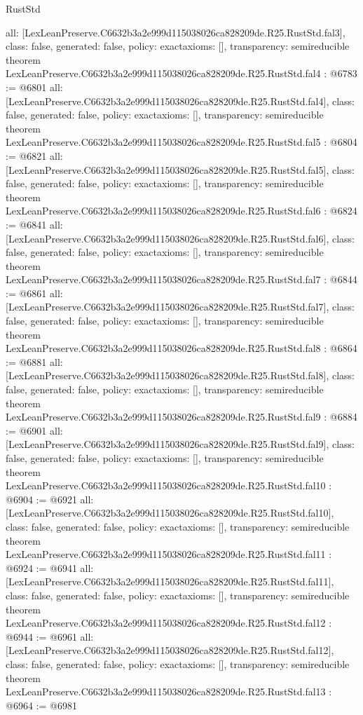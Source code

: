 \begin{lexlean}{RustStd}
\begin{coremodule}
{  all: [LexLeanPreserve.C6632b3a2e999d115038026ca828209de.R25.RustStd.fal3],
  class: false,
  generated: false,
  policy: exact{axioms: []},
  transparency: semireducible
}
theorem LexLeanPreserve.C6632b3a2e999d115038026ca828209de.R25.RustStd.fal4 : @6783 := @6801 {
  all: [LexLeanPreserve.C6632b3a2e999d115038026ca828209de.R25.RustStd.fal4],
  class: false,
  generated: false,
  policy: exact{axioms: []},
  transparency: semireducible
}
theorem LexLeanPreserve.C6632b3a2e999d115038026ca828209de.R25.RustStd.fal5 : @6804 := @6821 {
  all: [LexLeanPreserve.C6632b3a2e999d115038026ca828209de.R25.RustStd.fal5],
  class: false,
  generated: false,
  policy: exact{axioms: []},
  transparency: semireducible
}
theorem LexLeanPreserve.C6632b3a2e999d115038026ca828209de.R25.RustStd.fal6 : @6824 := @6841 {
  all: [LexLeanPreserve.C6632b3a2e999d115038026ca828209de.R25.RustStd.fal6],
  class: false,
  generated: false,
  policy: exact{axioms: []},
  transparency: semireducible
}
theorem LexLeanPreserve.C6632b3a2e999d115038026ca828209de.R25.RustStd.fal7 : @6844 := @6861 {
  all: [LexLeanPreserve.C6632b3a2e999d115038026ca828209de.R25.RustStd.fal7],
  class: false,
  generated: false,
  policy: exact{axioms: []},
  transparency: semireducible
}
theorem LexLeanPreserve.C6632b3a2e999d115038026ca828209de.R25.RustStd.fal8 : @6864 := @6881 {
  all: [LexLeanPreserve.C6632b3a2e999d115038026ca828209de.R25.RustStd.fal8],
  class: false,
  generated: false,
  policy: exact{axioms: []},
  transparency: semireducible
}
theorem LexLeanPreserve.C6632b3a2e999d115038026ca828209de.R25.RustStd.fal9 : @6884 := @6901 {
  all: [LexLeanPreserve.C6632b3a2e999d115038026ca828209de.R25.RustStd.fal9],
  class: false,
  generated: false,
  policy: exact{axioms: []},
  transparency: semireducible
}
theorem LexLeanPreserve.C6632b3a2e999d115038026ca828209de.R25.RustStd.fal10 : @6904 := @6921 {
  all: [LexLeanPreserve.C6632b3a2e999d115038026ca828209de.R25.RustStd.fal10],
  class: false,
  generated: false,
  policy: exact{axioms: []},
  transparency: semireducible
}
theorem LexLeanPreserve.C6632b3a2e999d115038026ca828209de.R25.RustStd.fal11 : @6924 := @6941 {
  all: [LexLeanPreserve.C6632b3a2e999d115038026ca828209de.R25.RustStd.fal11],
  class: false,
  generated: false,
  policy: exact{axioms: []},
  transparency: semireducible
}
theorem LexLeanPreserve.C6632b3a2e999d115038026ca828209de.R25.RustStd.fal12 : @6944 := @6961 {
  all: [LexLeanPreserve.C6632b3a2e999d115038026ca828209de.R25.RustStd.fal12],
  class: false,
  generated: false,
  policy: exact{axioms: []},
  transparency: semireducible
}
theorem LexLeanPreserve.C6632b3a2e999d115038026ca828209de.R25.RustStd.fal13 : @6964 := @6981 {
}
\end{coremodule}
\end{lexlean}
